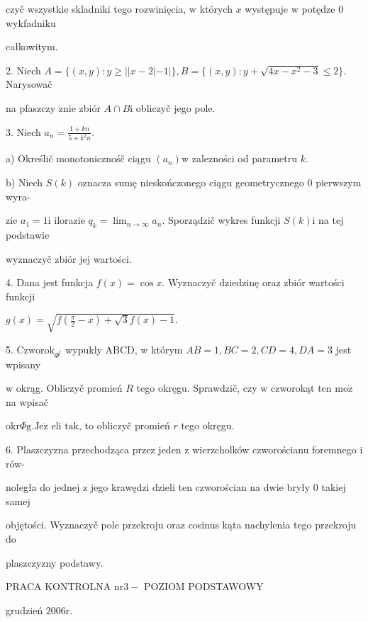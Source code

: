 \documentclass[a4paper,12pt]{article}
\begin{document}
czyč wszystkie skladniki tego rozwinięcia, $\mathrm{w}$ których $x$ występuje $\mathrm{w}$ potędze $0$ wykfadniku

całkowitym.

2. Niech $A=\{(x,y):y\geq||x-2|-1|\}, B=\{(x,y):y+\sqrt{4x-x^{2}-3}\leq 2\}$. Narysowač

na pfaszczy $\acute{\mathrm{z}}\mathrm{n}\mathrm{i}\mathrm{e}$ zbiór $A\cap B\mathrm{i}$ obliczyč jego pole.

3. Niech $a_{n}=\displaystyle \frac{1+kn}{5+k^{2}n}.$

a) Określič monotonicznośč ciągu $(a_{n})\mathrm{w}$ zalezności od parametru $k.$

b) Niech $S(k)$ oznacza sumę nieskończonego ciągu geometrycznego $0$ pierwszym wyra-

zie $a_{1}=1 \mathrm{i}$ ilorazie $q_{k}=\displaystyle \lim_{n\rightarrow\infty}a_{n}$. Sporządzič wykres funkcji $S(k)\mathrm{i}$ na tej podstawie

wyznaczyč zbiór jej wartości.

4. Dana jest funkcja $f(x)=\cos x$. Wyznaczyč dziedzinę oraz zbiór wartości funkcji

$g(x)=\sqrt{f(\frac{\pi}{2}-x)+\sqrt{3}f(x)-1}.$

5. $\mathrm{C}\mathrm{z}\mathrm{w}\mathrm{o}\mathrm{r}\mathrm{o}\mathrm{k}_{\Phi^{\mathrm{t}}}$ wypukly ABCD, $\mathrm{w}$ którym $AB=1, BC=2, CD=4, DA=3$ jest wpisany

$\mathrm{w}$ okrąg. Obliczyč promień $R$ tego okręgu. Sprawdzič, czy $\mathrm{w}$ czworokąt ten $\mathrm{m}\mathrm{o}\dot{\mathrm{z}}$ na wpisač

$\mathrm{o}\mathrm{k}\mathrm{r}\Phi \mathrm{g}. \mathrm{J}\mathrm{e}\dot{\mathrm{z}}$ eli $\mathrm{t}\mathrm{a}\mathrm{k}$, to obliczyč promień $r$ tego okręgu.

6. Plaszczyzna przechodząca przez jeden $\mathrm{z}$ wierzcholków czworościanu foremnego $\mathrm{i}$ rów-

noległa do jednej $\mathrm{z}$ jego krawędzi dzieli ten czworościan na dwie bryły $0$ takiej samej

objętości. Wyznaczyč pole przekroju oraz cosinus kąta nachylenia tego przekroju do

plaszczyzny podstawy.





PRACA KONTROLNA $\mathrm{n}\mathrm{r}3-$ POZIOM PODSTAWOWY

grudzień $2006\mathrm{r}.$
\end{document}
